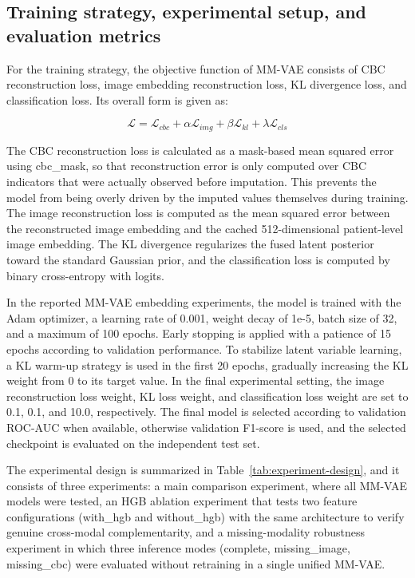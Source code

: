 \documentclass[conference]{IEEEtran}
\begin{document}
\subsection{Training strategy, experimental setup, and evaluation metrics}

For the training strategy, the objective function of MM-VAE consists of CBC reconstruction loss, image embedding reconstruction loss, KL divergence loss, and classification loss. Its overall form is given as:

\begin{equation}
\mathcal{L}=\mathcal{L}_{cbc}+\alpha\mathcal{L}_{img}+\beta\mathcal{L}_{kl}+\lambda\mathcal{L}_{cls}
\label{eq:loss}
\end{equation}

The CBC reconstruction loss is calculated as a mask-based mean squared error using cbc\_mask, so that reconstruction error is only computed over CBC indicators that were actually observed before imputation. This prevents the model from being overly driven by the imputed values themselves during training. The image reconstruction loss is computed as the mean squared error between the reconstructed image embedding and the cached 512-dimensional patient-level image embedding. The KL divergence regularizes the fused latent posterior toward the standard Gaussian prior, and the classification loss is computed by binary cross-entropy with logits.

In the reported MM-VAE embedding experiments, the model is trained with the Adam optimizer, a learning rate of 0.001, weight decay of 1e-5, batch size of 32, and a maximum of 100 epochs. Early stopping is applied with a patience of 15 epochs according to validation performance. To stabilize latent variable learning, a KL warm-up strategy is used in the first 20 epochs, gradually increasing the KL weight from 0 to its target value. In the final experimental setting, the image reconstruction loss weight, KL loss weight, and classification loss weight are set to 0.1, 0.1, and 10.0, respectively. The final model is selected according to validation ROC-AUC when available, otherwise validation F1-score is used, and the selected checkpoint is evaluated on the independent test set.

The experimental design is summarized in Table~\ref{tab:experiment-design}, and it consists of three experiments: a main comparison experiment, where all MM-VAE models were tested, an HGB ablation experiment that tests two feature configurations (with\_hgb and without\_hgb) with the same architecture to verify genuine cross-modal complementarity, and a missing-modality robustness experiment in which three inference modes (complete, missing\_image, missing\_cbc) were evaluated without retraining in a single unified MM-VAE.
\end{document}
